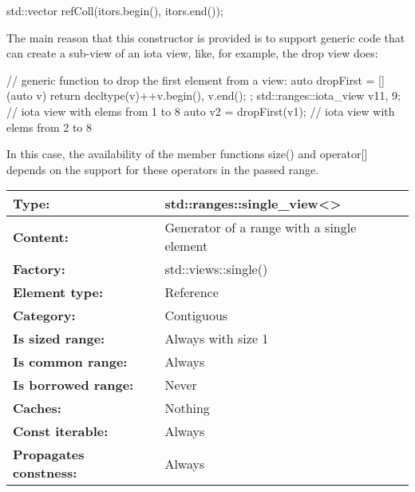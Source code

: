 \begin{cpp}
std::vector refColl(itors.begin(), itors.end());
\end{cpp}

The main reason that this constructor is provided is to support generic code that can create a sub-view of an iota view, like, for example, the drop view does:

\begin{cpp}
// generic function to drop the first element from a view:
auto dropFirst = [] (auto v) {
						return decltype(v){++v.begin(), v.end()};
					};
std::ranges::iota_view v1{1, 9}; // iota view with elems from 1 to 8
auto v2 = dropFirst(v1); // iota view with elems from 2 to 8
\end{cpp}

In this case, the availability of the member functions size() and operator[] depends on the support for these operators in the passed range.


\begin{longtable}[c]{|l|l|}
\hline
\textbf{Type:}                 & std::ranges::single\_view\textless{}\textgreater{} \\ \hline
\endfirsthead
%
\endhead
%
\textbf{Content:}              & Generator of a range with a single element         \\ \hline
\textbf{Factory:}              & std::views::single()                               \\ \hline
\textbf{Element type:}         & Reference                                          \\ \hline
\textbf{Category:}             & Contiguous                                         \\ \hline
\textbf{Is sized range:}       & Always with size 1                                 \\ \hline
\textbf{Is common range:}      & Always                                             \\ \hline
\textbf{Is borrowed range:}    & Never                                              \\ \hline
\textbf{Caches:}               & Nothing                                            \\ \hline
\textbf{Const iterable:}       & Always                                             \\ \hline
\textbf{Propagates constness:} & Always                                             \\ \hline
\end{longtable}

